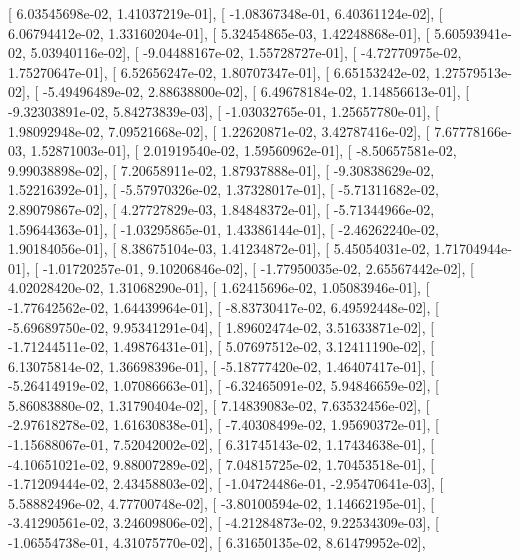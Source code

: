 \documentclass{article}
\begin{document}
       [  6.03545698e-02,   1.41037219e-01],
       [ -1.08367348e-01,   6.40361124e-02],
       [  6.06794412e-02,   1.33160204e-01],
       [  5.32454865e-03,   1.42248868e-01],
       [  5.60593941e-02,   5.03940116e-02],
       [ -9.04488167e-02,   1.55728727e-01],
       [ -4.72770975e-02,   1.75270647e-01],
       [  6.52656247e-02,   1.80707347e-01],
       [  6.65153242e-02,   1.27579513e-02],
       [ -5.49496489e-02,   2.88638800e-02],
       [  6.49678184e-02,   1.14856613e-01],
       [ -9.32303891e-02,   5.84273839e-03],
       [ -1.03032765e-01,   1.25657780e-01],
       [  1.98092948e-02,   7.09521668e-02],
       [  1.22620871e-02,   3.42787416e-02],
       [  7.67778166e-03,   1.52871003e-01],
       [  2.01919540e-02,   1.59560962e-01],
       [ -8.50657581e-02,   9.99038898e-02],
       [  7.20658911e-02,   1.87937888e-01],
       [ -9.30838629e-02,   1.52216392e-01],
       [ -5.57970326e-02,   1.37328017e-01],
       [ -5.71311682e-02,   2.89079867e-02],
       [  4.27727829e-03,   1.84848372e-01],
       [ -5.71344966e-02,   1.59644363e-01],
       [ -1.03295865e-01,   1.43386144e-01],
       [ -2.46262240e-02,   1.90184056e-01],
       [  8.38675104e-03,   1.41234872e-01],
       [  5.45054031e-02,   1.71704944e-01],
       [ -1.01720257e-01,   9.10206846e-02],
       [ -1.77950035e-02,   2.65567442e-02],
       [  4.02028420e-02,   1.31068290e-01],
       [  1.62415696e-02,   1.05083946e-01],
       [ -1.77642562e-02,   1.64439964e-01],
       [ -8.83730417e-02,   6.49592448e-02],
       [ -5.69689750e-02,   9.95341291e-04],
       [  1.89602474e-02,   3.51633871e-02],
       [ -1.71244511e-02,   1.49876431e-01],
       [  5.07697512e-02,   3.12411190e-02],
       [  6.13075814e-02,   1.36698396e-01],
       [ -5.18777420e-02,   1.46407417e-01],
       [ -5.26414919e-02,   1.07086663e-01],
       [ -6.32465091e-02,   5.94846659e-02],
       [  5.86083880e-02,   1.31790404e-02],
       [  7.14839083e-02,   7.63532456e-02],
       [ -2.97618278e-02,   1.61630838e-01],
       [ -7.40308499e-02,   1.95690372e-01],
       [ -1.15688067e-01,   7.52042002e-02],
       [  6.31745143e-02,   1.17434638e-01],
       [ -4.10651021e-02,   9.88007289e-02],
       [  7.04815725e-02,   1.70453518e-01],
       [ -1.71209444e-02,   2.43458803e-02],
       [ -1.04724486e-01,  -2.95470641e-03],
       [  5.58882496e-02,   4.77700748e-02],
       [ -3.80100594e-02,   1.14662195e-01],
       [ -3.41290561e-02,   3.24609806e-02],
       [ -4.21284873e-02,   9.22534309e-03],
       [ -1.06554738e-01,   4.31075770e-02],
       [  6.31650135e-02,   8.61479952e-02],
\end{document}
